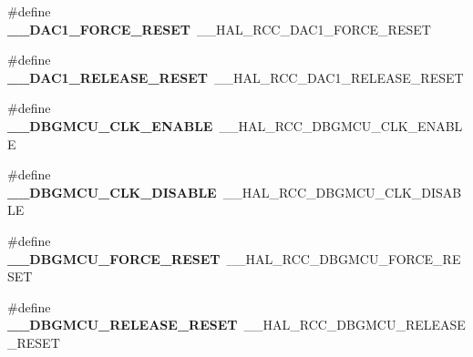 \begin{DoxyCompactItemize}
\item 
\mbox{\label{group___h_a_l___r_c_c___aliased_gaf0e724beab212d0055d9186d7790bccd}} 
\#define {\bfseries \+\_\+\+\_\+\+D\+A\+C1\+\_\+\+F\+O\+R\+C\+E\+\_\+\+R\+E\+S\+ET}~\+\_\+\+\_\+\+H\+A\+L\+\_\+\+R\+C\+C\+\_\+\+D\+A\+C1\+\_\+\+F\+O\+R\+C\+E\+\_\+\+R\+E\+S\+ET
\item 
\mbox{\label{group___h_a_l___r_c_c___aliased_ga7492fedac23dcce3cf6fcac88c4a5688}} 
\#define {\bfseries \+\_\+\+\_\+\+D\+A\+C1\+\_\+\+R\+E\+L\+E\+A\+S\+E\+\_\+\+R\+E\+S\+ET}~\+\_\+\+\_\+\+H\+A\+L\+\_\+\+R\+C\+C\+\_\+\+D\+A\+C1\+\_\+\+R\+E\+L\+E\+A\+S\+E\+\_\+\+R\+E\+S\+ET
\item 
\mbox{\label{group___h_a_l___r_c_c___aliased_ga22d83d5c92b7c06f58299bf76c0ba1ef}} 
\#define {\bfseries \+\_\+\+\_\+\+D\+B\+G\+M\+C\+U\+\_\+\+C\+L\+K\+\_\+\+E\+N\+A\+B\+LE}~\+\_\+\+\_\+\+H\+A\+L\+\_\+\+R\+C\+C\+\_\+\+D\+B\+G\+M\+C\+U\+\_\+\+C\+L\+K\+\_\+\+E\+N\+A\+B\+LE
\item 
\mbox{\label{group___h_a_l___r_c_c___aliased_ga2f545f52b81246ca674c70fbd6c4d558}} 
\#define {\bfseries \+\_\+\+\_\+\+D\+B\+G\+M\+C\+U\+\_\+\+C\+L\+K\+\_\+\+D\+I\+S\+A\+B\+LE}~\+\_\+\+\_\+\+H\+A\+L\+\_\+\+R\+C\+C\+\_\+\+D\+B\+G\+M\+C\+U\+\_\+\+C\+L\+K\+\_\+\+D\+I\+S\+A\+B\+LE
\item 
\mbox{\label{group___h_a_l___r_c_c___aliased_gad77740fa4597914c4cd28b6b322ea714}} 
\#define {\bfseries \+\_\+\+\_\+\+D\+B\+G\+M\+C\+U\+\_\+\+F\+O\+R\+C\+E\+\_\+\+R\+E\+S\+ET}~\+\_\+\+\_\+\+H\+A\+L\+\_\+\+R\+C\+C\+\_\+\+D\+B\+G\+M\+C\+U\+\_\+\+F\+O\+R\+C\+E\+\_\+\+R\+E\+S\+ET
\item 
\mbox{\label{group___h_a_l___r_c_c___aliased_ga48cf864f29a3c9a1bd73664291824538}} 
\#define {\bfseries \+\_\+\+\_\+\+D\+B\+G\+M\+C\+U\+\_\+\+R\+E\+L\+E\+A\+S\+E\+\_\+\+R\+E\+S\+ET}~\+\_\+\+\_\+\+H\+A\+L\+\_\+\+R\+C\+C\+\_\+\+D\+B\+G\+M\+C\+U\+\_\+\+R\+E\+L\+E\+A\+S\+E\+\_\+\+R\+E\+S\+ET
\item 
\mbox{\label{group___h_a_l___r_c_c___aliased_ga7cc3dfa13e529c36891e9fda56d63e08}} 

\end{DoxyCompactItemize}
